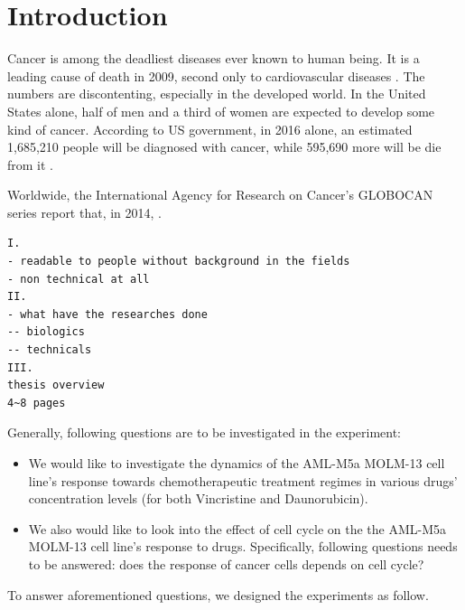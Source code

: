 \documentclass[pdftex,12pt,a4paper]{report}
\begin{document}
\newpage

\tableofcontents

\newpage

\listoffigures

\newpage

\listoftables

\newpage

\chapter{Introduction}

Cancer is among the deadliest diseases ever known to human being. It is a leading cause of death in 2009, second only to cardiovascular diseases \cite{sudhakar2009history}. The numbers are discontenting, especially in the developed world. In the United States alone, half of men and a third of women are expected to develop some kind of cancer. According to US government, in 2016 alone, an estimated 1,685,210 people will be diagnosed with cancer, while 595,690 more will be die from it \cite{cancergov2017stat}.

Worldwide, the International Agency for Research on Cancer's GLOBOCAN series report that, in 2014, \cite{ferlay2015cancer}.

\begin{verbatim}
I.
- readable to people without background in the fields
- non technical at all
II.
- what have the researches done
-- biologics
-- technicals
III.
thesis overview
4~8 pages
\end{verbatim}


Generally, following questions are to be investigated in the experiment:

\begin{itemize}
\item We would like to investigate the dynamics of the AML-M5a MOLM-13 cell line's response towards chemotherapeutic treatment regimes in various drugs' concentration levels (for both Vincristine and Daunorubicin).
\item We also would like to look into the effect of cell cycle on the the AML-M5a MOLM-13 cell line's response to drugs. Specifically, following questions needs to be answered: does the response of cancer cells depends on cell cycle?
\end{itemize}

To answer aforementioned questions, we designed the experiments as follow.
\end{document}
